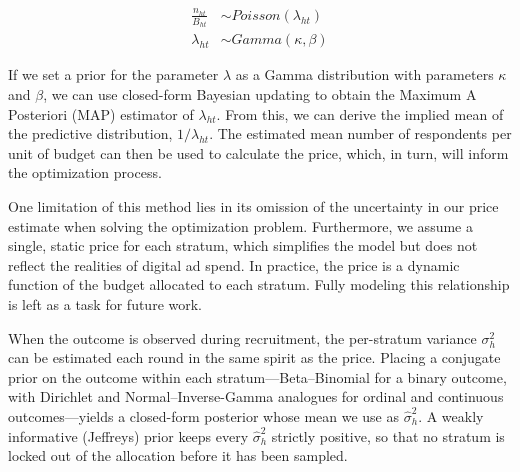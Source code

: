 \begin{align*}
\frac{n_{ht}}{ B_{ht}} &\sim Poisson(\lambda_{ht}) \\
\lambda_{ht} &\sim Gamma(\kappa, \beta)
\end{align*}

If we set a prior for the parameter \(\lambda\) as a Gamma distribution with parameters \(\kappa\) and \(\beta\), we can use closed-form Bayesian updating to obtain the Maximum A Posteriori (MAP) estimator of \(\lambda_{ht}\). From this, we can derive the implied mean of the predictive distribution, \(1 / \lambda_{ht}\). The estimated mean number of respondents per unit of budget can then be used to calculate the price, which, in turn, will inform the optimization process.


One limitation of this method lies in its omission of the uncertainty in our price estimate when solving the optimization problem. Furthermore, we assume a single, static price for each stratum, which simplifies the model but does not reflect the realities of digital ad spend. In practice, the price is a dynamic function of the budget allocated to each stratum. Fully modeling this relationship is left as a task for future work.


When the outcome is observed during recruitment, the per-stratum variance $\sigma_h^2$ can be estimated each round in the same spirit as the price. Placing a conjugate prior on the outcome within each stratum---Beta--Binomial for a binary outcome, with Dirichlet and Normal--Inverse-Gamma analogues for ordinal and continuous outcomes---yields a closed-form posterior whose mean we use as $\hat\sigma_h^2$. A weakly informative (Jeffreys) prior keeps every $\hat\sigma_h^2$ strictly positive, so that no stratum is locked out of the allocation before it has been sampled.

